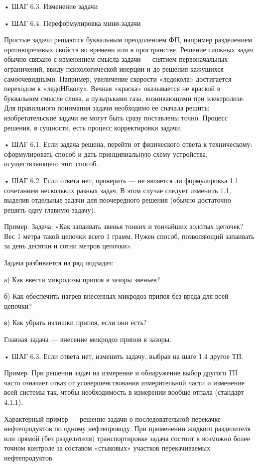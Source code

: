 • ШАГ 6.3. Изменение задачи

• ШАГ 6.4. Переформулировка мини-задачи


Простые   задачи  решаются   буквальным   преодолением  ФП,   например
разделением  противоречивых свойств  во  времени  или в  пространстве.
Решение  сложных задач  обычно связано  с изменением  смысла задачи  —
снятием  первоначальных ограничений,  ввиду психологической  инерции и
до  решения кажущихся  самоочевидными.  Например, увеличение  скорости
«ледокола»  достигается  переходом  к  «ледоНЕколу».  Вечная  «краска»
оказывается  не  краской  в  буквальном  смысле  слова,  а  пузырьками
газа, возникающими  при электролизе. Для правильного  понимания задачи
необходимо ее  сначала решить:  изобретательские задачи не  могут быть
сразу  поставлены точно.  Процесс  решения, в  сущности, есть  процесс
корректировки задачи.

•  ШАГ  6.1. Если  задача  решена,  перейти  от физического  ответа  к
техническому:  сформулировать  способ   и  дать  принципиальную  схему
устройства, осуществляющего этот способ.

• ШАГ  6.2. Если ответа нет,  проверить — не является  ли формулировка
1.1 сочетанием нескольких разных задач. В этом случае следует изменить
1.1,  выделив  отдельные  задачи   для  поочередного  решения  (обычно
достаточно решить одну главную задачу).

Пример.  Задача:  «Как запаивать  звенья  тонких  и тончайших  золотых
цепочек?  Вес 1  метра  такой  цепочки всего  1  грамм. Нужен  способ,
позволяющий запаивать за день десятки и сотни метров цепочки».

Задача разбивается на ряд подзадач:

а) Как ввести микродозы припоя в зазоры звеньев?

б) Как обеспечить нагрев внесенных  микродоз припоя без вреда для всей
цепочки?

в) Как убрать излишки припоя, если они есть?

Главная задача — внесение микродоз припоя в зазоры.

• ШАГ 6.3. Если ответа нет, изменить задачу, выбрав на шаге 1.4 другое
ТП.

Пример. При решении задач на  измерение и обнаружение выбор другого ТП
часто  означает  отказ  от усовершенствования  измерительной  части  и
изменение  всей системы  так, чтобы  необходимость в  измерении вообще
отпала (стандарт 4.1.1).

Характерный  пример  —  решение задачи  о  последовательной  перекачке
нефтепродуктов   по  одному   нефтепроводу.  При   применении  жидкого
разделителя  или  прямой   (без  разделителя)  транспортировке  задача
состоит  в  возможно  более  точном контроле  за  составом  «стыковых»
участков перекачиваемых нефтепродуктов.

